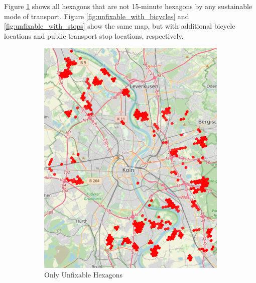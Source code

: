 Figure \ref{fig:only_unfixable_hexagons} shows all hexagons that are not 15-minute hexagons by any sustainable mode of transport.
Figure \ref{fig:unfixable_with_bicycles} and \ref{fig:unfixable_with_stops} show the same map, but with additional bicycle locations and public transport stop locations, respectively.
\begin{figure}
     \centering
     \begin{subfigure}[b]{0.30\textwidth}
         \centering
         \includegraphics[width=\textwidth]{Figures/results/problematic_hexagons/unfixable.png}
         \caption{Only Unfixable Hexagons}
         \label{fig:only_unfixable_hexagons}
     \end{subfigure}
     \hfill
     \begin{subfigure}[b]{0.30\textwidth}
         \centering

\end{subfigure}
\end{figure}
